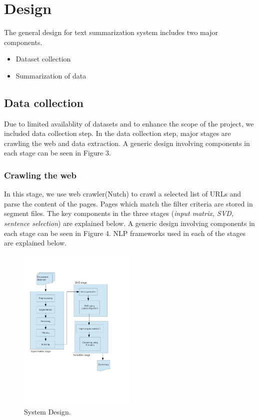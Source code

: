 \chapter{Design}


The general design for text summarization system includes two major components.
\begin{itemize}
\item{} Dataset collection
\item{} Summarization of data
\end{itemize}
\section{Data collection}
Due to limited availablity of datasets and to enhance the scope of the project, we included data collection step.
In the data collection step, major stages are crawling the web and data extraction.
A generic design involving components in each stage can be seen in Figure 3.
\subsection{Crawling the web}
In this stage, we use web crawler(Nutch) to crawl a selected list of URLs and parse the content of the pages. Pages which 
match the filter criteria are stored in segment files.
The key components in the three 
stages (\textit{input matrix, SVD, sentence selection}) are explained below. A generic design involving components in each
stage can be seen in Figure 4. NLP frameworks used in each of the stages are explained below.
\begin{figure}[ht!]
  \centering
    \includegraphics[width=0.5\textwidth]{design.jpg}
    \caption{System Design.}
\end{figure}
